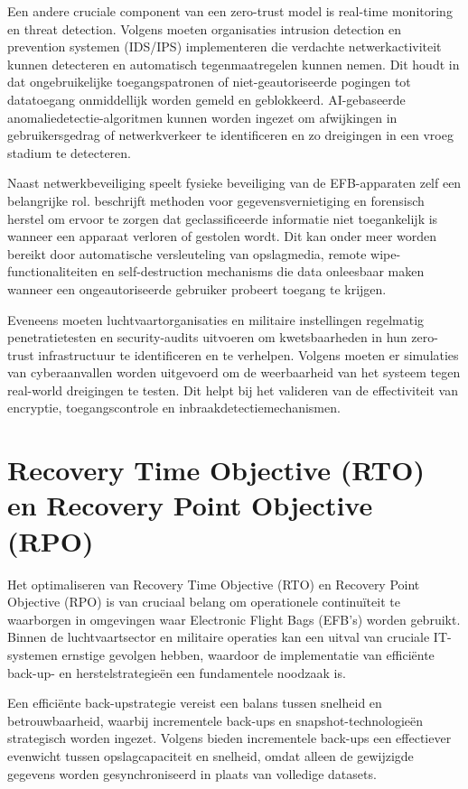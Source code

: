 Een andere cruciale component van een zero-trust model is real-time monitoring en threat detection. Volgens \textcite{EFBDataSecurity} moeten organisaties intrusion detection en prevention systemen (IDS/IPS) implementeren die verdachte netwerkactiviteit kunnen detecteren en automatisch tegenmaatregelen kunnen nemen. Dit houdt in dat ongebruikelijke toegangspatronen of niet-geautoriseerde pogingen tot datatoegang onmiddellijk worden gemeld en geblokkeerd. AI-gebaseerde anomaliedetectie-algoritmen kunnen worden ingezet om afwijkingen in gebruikersgedrag of netwerkverkeer te identificeren en zo dreigingen in een vroeg stadium te detecteren.

Naast netwerkbeveiliging speelt fysieke beveiliging van de EFB-apparaten zelf een belangrijke rol. \textcite{DoD5220} beschrijft methoden voor gegevensvernietiging en forensisch herstel om ervoor te zorgen dat geclassificeerde informatie niet toegankelijk is wanneer een apparaat verloren of gestolen wordt. Dit kan onder meer worden bereikt door automatische versleuteling van opslagmedia, remote wipe-functionaliteiten en self-destruction mechanisms die data onleesbaar maken wanneer een ongeautoriseerde gebruiker probeert toegang te krijgen.

Eveneens moeten luchtvaartorganisaties en militaire instellingen regelmatig penetratietesten en security-audits uitvoeren om kwetsbaarheden in hun zero-trust infrastructuur te identificeren en te verhelpen. Volgens \textcite{ACISAPGSECVEIL004} moeten er simulaties van cyberaanvallen worden uitgevoerd om de weerbaarheid van het systeem tegen real-world dreigingen te testen. Dit helpt bij het valideren van de effectiviteit van encryptie, toegangscontrole en inbraakdetectiemechanismen.
        
\section{Recovery Time Objective (RTO) en Recovery Point Objective (RPO)}

Het optimaliseren van Recovery Time Objective (RTO) en Recovery Point Objective (RPO) is van cruciaal belang om operationele continuïteit te waarborgen in omgevingen waar Electronic Flight Bags (EFB’s) worden gebruikt. Binnen de luchtvaartsector en militaire operaties kan een uitval van cruciale IT-systemen ernstige gevolgen hebben, waardoor de implementatie van efficiënte back-up- en herstelstrategieën een fundamentele noodzaak is.

Een efficiënte back-upstrategie vereist een balans tussen snelheid en betrouwbaarheid, waarbij incrementele back-ups en snapshot-technologieën strategisch worden ingezet. Volgens \textcite{VeeamRTO} bieden incrementele back-ups een effectiever evenwicht tussen opslagcapaciteit en snelheid, omdat alleen de gewijzigde gegevens worden gesynchroniseerd in plaats van volledige datasets.

